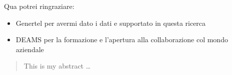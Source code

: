 \documentclass[a4paper, nobind]{templates/ociamthesis}
\theoremstyle{definition}
\theoremstyle{definition}
\theoremstyle{definition}
\theoremstyle{remark}
\begin{document}
\begin{romanpages}
\titlespacing*{\chapter}{0pt}{0pt}{35pt}


\null\newpage

\null\newpage


\begin{acknowledgements}
 	Qua potrei ringraziare:

  \begin{itemize}
  \item
    Genertel per avermi dato i dati e supportato in questa ricerca
  \item
    DEAMS per la formazione e l'apertura alla collaborazione col mondo aziendale
  \end{itemize}
\end{acknowledgements}


\begin{abstract}
  This is my abstract \dots
\end{abstract}




\flushbottom

\renewcommand{\contentsname}{\textbf{Table of Contents}}
\renewcommand{\listfigurename}{\textbf{List of Figures}}
\renewcommand{\listtablename}{\textbf{List of Tables}}
\tableofcontents

\listoffigures
	\mtcaddchapter

\listoftables
  \mtcaddchapter


\end{romanpages}
\end{document}
